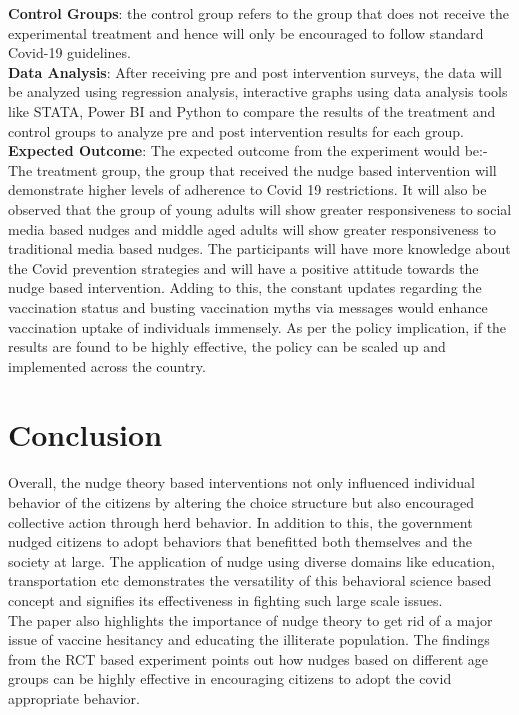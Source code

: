 \documentclass[12pt, a4paper]{article}
\begin{document}
\textbf{Control Groups}: the control group refers to the group that does not receive the experimental treatment and hence will only be encouraged to follow standard Covid-19 guidelines.\\


\textbf{Data Analysis}: After receiving pre and post intervention surveys, the data will be analyzed using regression analysis, interactive graphs using data analysis tools like STATA, Power BI and Python to compare the results of the treatment and control groups to analyze pre and post intervention results for each group.\\



\textbf{Expected Outcome}: The expected outcome from the experiment would be:-\\
The treatment group, the group that received the nudge based intervention will demonstrate higher levels of adherence to Covid 19 restrictions. It will also be observed that the group of young adults will show greater responsiveness to social media based nudges and middle aged adults will show greater responsiveness to traditional media based nudges. The participants will have more knowledge about the Covid prevention strategies and will have a positive attitude towards the nudge based intervention. Adding to this, the constant updates regarding the vaccination status and busting vaccination myths via messages would enhance vaccination uptake of individuals immensely. As per the policy implication, if the results are found to be highly effective, the policy can be scaled up and implemented across the country.\\

\section{\centering Conclusion}
Overall, the nudge theory based interventions not only influenced individual behavior of the citizens by altering the choice structure but also encouraged collective action through herd behavior. In addition to this, the government nudged citizens to adopt behaviors that benefitted both themselves and the society at large. The application of nudge using diverse domains like education, transportation etc demonstrates the versatility of this behavioral science based concept and signifies its effectiveness in fighting such large scale issues.\\

The paper also highlights the importance of nudge theory to get rid of a major issue of vaccine hesitancy and educating the illiterate population. The findings from the RCT based experiment points out how nudges based on different age groups can be highly effective in encouraging citizens to adopt the covid appropriate behavior. \\
\end{document}
